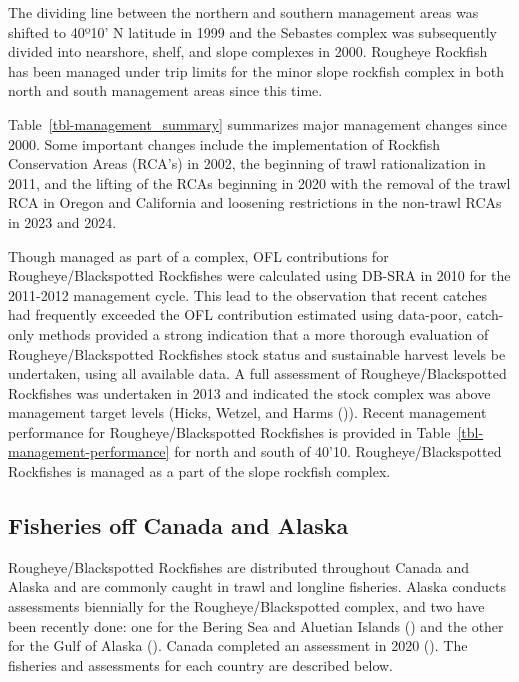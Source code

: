 \documentclass[
]{scrartcl}
\begin{document}
The dividing line between the northern and southern management areas was
shifted to 40º10' N latitude in 1999 and the Sebastes complex was
subsequently divided into nearshore, shelf, and slope complexes in 2000.
Rougheye Rockfish has been managed under trip limits for the minor slope
rockfish complex in both north and south management areas since this
time.

Table~\ref{tbl-management_summary} summarizes major management changes
since 2000. Some important changes include the implementation of
Rockfish Conservation Areas (RCA's) in 2002, the beginning of trawl
rationalization in 2011, and the lifting of the RCAs beginning in 2020
with the removal of the trawl RCA in Oregon and California and loosening
restrictions in the non-trawl RCAs in 2023 and 2024.

Though managed as part of a complex, OFL contributions for
Rougheye/Blackspotted Rockfishes were calculated using DB-SRA in 2010
for the 2011-2012 management cycle. This lead to the observation that
recent catches had frequently exceeded the OFL contribution estimated
using data-poor, catch-only methods provided a strong indication that a
more thorough evaluation of Rougheye/Blackspotted Rockfishes stock
status and sustainable harvest levels be undertaken, using all available
data. A full assessment of Rougheye/Blackspotted Rockfishes was
undertaken in 2013 and indicated the stock complex was above management
target levels (Hicks, Wetzel, and Harms
()). Recent management performance
for Rougheye/Blackspotted Rockfishes is provided in
Table~\ref{tbl-management-performance} for north and south of 40'10.
Rougheye/Blackspotted Rockfishes is managed as a part of the slope
rockfish complex.

\subsection{Fisheries off Canada and
Alaska}\label{fisheries-off-canada-and-alaska}

Rougheye/Blackspotted Rockfishes are distributed throughout Canada and
Alaska and are commonly caught in trawl and longline fisheries. Alaska
conducts assessments biennially for the Rougheye/Blackspotted complex,
and two have been recently done: one for the Bering Sea and Aluetian
Islands () and the other for the Gulf of Alaska
(). Canada
completed an assessment in 2020
().
The fisheries and assessments for each country are described below.
\end{document}
